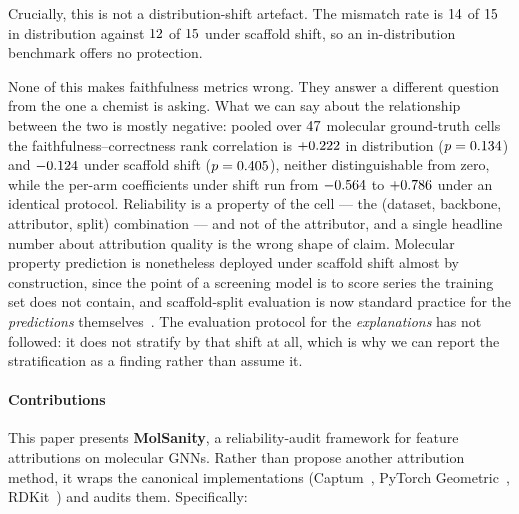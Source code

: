 Crucially, this is not a distribution-shift artefact. The mismatch rate is
$14{}$ of $15{}$ in distribution against
$12{}$ of $15{}$ under scaffold shift, so an
in-distribution benchmark offers no protection.

None of this makes faithfulness metrics wrong. They answer a different question
from the one a chemist is asking. What we can say about the relationship
between the two is mostly negative: pooled over $47{}$ molecular
ground-truth cells the faithfulness--correctness rank correlation is
$+0.222{}$ in distribution ($p=0.134{}$) and $-0.124{}$
under scaffold shift ($p=0.405{}$), neither distinguishable from zero,
while the per-arm coefficients under shift run from $-0.564{}$ to
$+0.786{}$ under an identical protocol. Reliability is a property of
the cell --- the (dataset, backbone, attributor, split) combination --- and not
of the attributor, and a single headline number about attribution quality is
the wrong shape of claim. Molecular property prediction is nonetheless deployed
under scaffold shift almost by construction, since the point of a screening
model is to score series the training set does not contain, and scaffold-split
evaluation is now standard practice for the \emph{predictions}
themselves~\cite{mjepa,moleculenet}. The evaluation protocol for the
\emph{explanations} has not followed: it does not stratify by that shift at
all, which is why we can report the stratification as a finding rather than
assume it.

\paragraph{Contributions} This paper presents \textbf{MolSanity}, a
reliability-audit framework for feature attributions on molecular GNNs. Rather
than propose another attribution method, it wraps the canonical
implementations (Captum~\cite{captum}, PyTorch Geometric~\cite{pyg},
RDKit~\cite{rdkit}) and audits them. Specifically:

